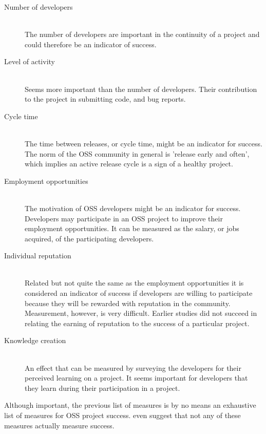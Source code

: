 \begin{description}
	\item[Number of developers] \hfill \\ The number of developers are
		important in the continuity of a project and could therefore be an indicator
		of success.
		
	\item[Level of activity] \hfill \\ Seems more important than the number of
		developers. Their contribution to the project in submitting code, and bug
		reports.
		
	\item[Cycle time] \hfill \\ The time between releases, or cycle time, might
		be an indicator for success. The norm of the OSS community in general is
		'release early and often', which implies an active release cycle is a sign of
		a healthy project.
		
	\item[Employment opportunities] \hfill \\ The motivation of OSS developers
		might be an indicator for success. Developers may participate in an OSS
		project to improve their employment opportunities. It can be measured as the
		salary, or jobs acquired, of the participating developers.
		
	\item[Individual reputation] \hfill \\ Related but not quite the same as
		the employment opportunities it is considered an indicator of success if
		developers are willing to participate because they will be rewarded with
		reputation in the community. Measurement, however, is very difficult. Earlier
		studies did not succeed in relating the earning of reputation to the
		success of a particular project.
		
	\item[Knowledge creation] \hfill \\ An effect that can be measured by
		surveying the developers for their perceived learning on a project. It seems
		important for developers that they learn during their participation in a
		project.
\end{description}

\noindent
Although important, the previous list of measures is by no means an exhaustive
list of measures for OSS project success. \citet{crowston2003} even suggest
that not any of these measures actually measure success.

